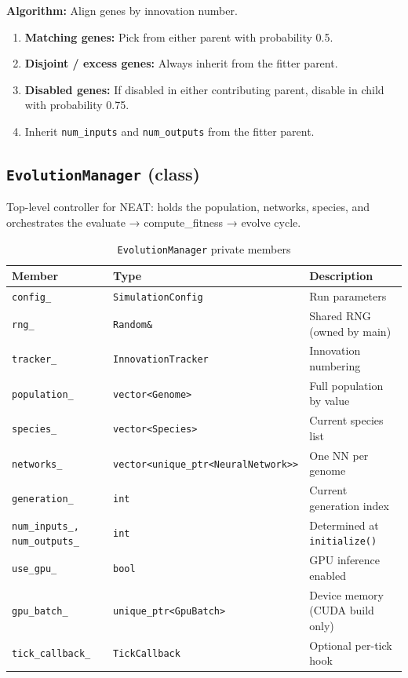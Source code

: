 \textbf{Algorithm:} Align genes by innovation number.
\begin{enumerate}[nosep]
  \item \textbf{Matching genes:} Pick from either parent with probability 0.5.
  \item \textbf{Disjoint / excess genes:} Always inherit from the fitter parent.
  \item \textbf{Disabled genes:} If disabled in either contributing parent, disable
    in child with probability 0.75.
  \item Inherit \texttt{num\_inputs} and \texttt{num\_outputs} from the fitter parent.
\end{enumerate}

\subsection{\texttt{EvolutionManager} (class)}

Top-level controller for NEAT: holds the population, networks, species, and orchestrates
the evaluate → compute\_fitness → evolve cycle.

\begin{table}[H]
\centering\small
\caption{\texttt{EvolutionManager} private members}
\begin{tabularx}{\textwidth}{@{}llX@{}}
\toprule
\textbf{Member} & \textbf{Type} & \textbf{Description} \\
\midrule
\texttt{config\_}     & \texttt{SimulationConfig}                    & Run parameters \\
\texttt{rng\_}        & \texttt{Random\&}                            & Shared RNG (owned by main) \\
\texttt{tracker\_}    & \texttt{InnovationTracker}                   & Innovation numbering \\
\texttt{population\_} & \texttt{vector<Genome>}                      & Full population by value \\
\texttt{species\_}    & \texttt{vector<Species>}                     & Current species list \\
\texttt{networks\_}   & \texttt{vector<unique\_ptr<NeuralNetwork>>}  & One NN per genome \\
\texttt{generation\_} & \texttt{int}                                 & Current generation index \\
\texttt{num\_inputs\_, num\_outputs\_} & \texttt{int}             & Determined at \texttt{initialize()} \\
\texttt{use\_gpu\_}   & \texttt{bool}                                & GPU inference enabled \\
\texttt{gpu\_batch\_} & \texttt{unique\_ptr<GpuBatch>}               & Device memory (CUDA build only) \\
\texttt{tick\_callback\_} & \texttt{TickCallback}                    & Optional per-tick hook \\
\bottomrule
\end{tabularx}
\end{table}

